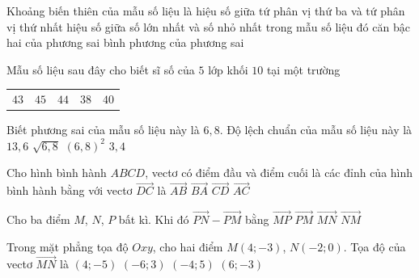\begin{ex}%
Khoảng biến thiên của mẫu số liệu là
\choice
{hiệu số giữa tứ phân vị thứ ba và tứ phân vị thứ nhất}
{\True hiệu số giữa số lớn nhất và số nhỏ nhất trong mẫu số liệu đó}
{căn bậc hai của phương sai}
{bình phương của phương sai}
\end{ex}
\begin{ex}%
Mẫu số liệu sau đây cho biết sĩ số của $5$ lớp khối $10$ tại một trường
\begin{center}
\begin{tabular}{lllll}
	$43$&$45$& $44$& $38$& $40$\\
\end{tabular}
\end{center}
Biết phương sai của mẫu số liệu này là $6{,}8$. Độ lệch chuẩn của mẫu số liệu này là
\choice
{$13{,}6$}
{\True $\sqrt{6,8}$}
{$(6{,}8)^2$}
{$3{,}4$}
\end{ex}
\begin{ex}%
Cho hình bình hành $ABCD$, vectơ có điểm đầu và điểm cuối là các đỉnh của hình bình hành bằng với vectơ $\overrightarrow{DC}$ là
\choice
{\True $\overrightarrow{AB}$}
{$\overrightarrow{BA}$}
{$\overrightarrow{CD}$}
{$\overrightarrow{AC}$}
\end{ex}
\begin{ex}%
Cho ba điểm $M$, $N$, $P$ bất kì. Khi đó $\overrightarrow{PN}-\overrightarrow{PM}$ bằng
\choice
{\True $\overrightarrow{MP}$}
{$\overrightarrow{PM}$}
{$\overrightarrow{MN}$}
{$\overrightarrow{NM}$}
\end{ex}
\begin{ex}%
Trong mặt phẳng tọa độ $Oxy$, cho hai điểm $M(4;-3)$, $N(-2; 0)$. Tọa độ của vectơ $\overrightarrow{MN}$ là
\choice
{$(4;-5)$}
{\True $(-6; 3)$}
{$(-4; 5)$}
{$(6;-3)$}
\end{ex}
